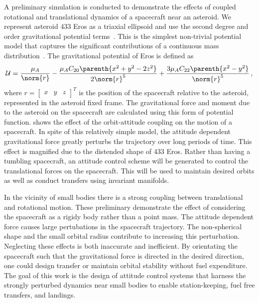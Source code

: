 \documentclass[11pt]{article} %
\begin{document}
A preliminary simulation is conducted to demonstrate the effects of coupled rotational and translational dynamics of a spacecraft near an asteroid.
We represent asteroid 433 Eros as a triaxial ellipsoid and use the second degree and order gravitational potential terms~\cite{hu2008,scheeres2003}.
This is the simplest non-trivial potential model that captures the significant contributions of a continuous mass distribution~\cite{scheeres2012a}.
The gravitational potential of Eros is defined as
\begin{align*}
	\mathcal{U} = \frac{\mu_A}{\norm{r}}-\frac{\mu_A C_{20} \parenth{x^2 + y^2 - 2 z^2}}{2 \norm{r}^5} + \frac{3 \mu_A C_{22} \parenth{x^2 - y^2}}{\norm{r}^5}\, ,
\end{align*}
where \( r = \begin{bmatrix} x & y & z \end{bmatrix}^T \) is the position of the spacecraft relative to the asteroid, represented in the asteroid fixed frame.
The gravitational force and moment due to the asteroid on the spacecraft are calculated using this form of potential function.
 shows the effect of the orbit-attitude coupling on the motion of a spacecraft.
In spite of this relatively simple model, the attitude dependent gravitational force greatly perturbs the trajectory over long periods of time.
This effect is magnified due to the distended shape of 433 Eros.
Rather than having a tumbling spacecraft, an attitude control scheme will be generated to control the translational forces on the spacecraft. 
This will be used to maintain desired orbits as well as conduct transfers using invariant manifolds.

In the vicinity of small bodies there is a strong coupling between translational and rotational motion.
These preliminary demonstrate the effect of considering the spacecraft as a rigidy body rather than a point mass.
The attitude dependent force causes large pertubations in the spacecraft trajectory. 
The non-spherical shape and the small orbital radius contribute to increasing this perturbation.
Neglecting these effects is both inaccurate and inefficient.
By orientating the spacecraft such that the gravitational force is directed in the desired direction, one could design transfer or maintain orbital stability without fuel expenditure. 
The goal of this work is the design of attitude control systems that harness the strongly perturbed dynamics near small bodies to enable station-keeping, fuel free transfers, and landings.

%



\end{document}
